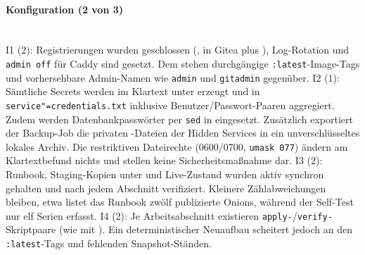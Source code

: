 \paragraph{Konfiguration (2 von 3)} \mbox{}\\
I1 (2): Registrierungen wurden geschlossen (,
in Gitea  plus ), Log-Rotation und \texttt{admin off} für Caddy sind gesetzt. Dem stehen durchgängige \texttt{:latest}-Image-Tags und
vorhersehbare Admin-Namen wie \texttt{admin} und \texttt{gitadmin} gegenüber.\cite{composeA,deployscriptA,selfauditA}
I2 (1): Sämtliche Secrets werden im Klartext unter  erzeugt und in \texttt{service"=credentials.txt} inklusive Benutzer/Passwort-Paaren aggregiert. 
Zudem werden Datenbankpasswörter per \texttt{sed} in  eingesetzt. 
Zusätzlich exportiert der Backup-Job die privaten -Dateien der Hidden
Services in ein unverschlüsseltes lokales Archiv. 
Die restriktiven Dateirechte (0600/0700, \texttt{umask 077}) ändern am Klartextbefund nichts und stellen keine Sicherheitsmaßnahme dar.\cite{deployscriptA,backupscriptA,selfauditA}
I3 (2): Runbook, Staging-Kopien unter  und Live-Zustand wurden aktiv synchron gehalten und nach jedem Abschnitt verifiziert. Kleinere Zählabweichungen bleiben, etwa listet das Runbook zwölf publizierte Onions, während der Self-Test nur elf Serien erfasst.\cite{runbookA}
I4 (2): Je Arbeitsabschnitt existieren \texttt{apply-}/\texttt{verify-}Skriptpaare (wie  mit ). 
Ein deterministischer Neuaufbau scheitert jedoch an den \texttt{:latest}-Tags und fehlenden
Snapshot-Ständen.\cite{runbookA,composeA}

